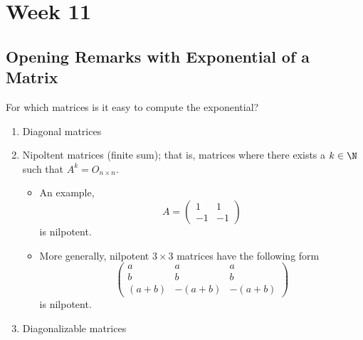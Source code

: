 \section{Week 11}

\subsection{Opening Remarks with Exponential of a Matrix}

\begin{remark}
    For which matrices is it easy to compute the exponential?
    \begin{enumerate}
        \item[(1)] Diagonal matrices
        \item[(2)] Nipoltent matrices (finite sum); that is, matrices where there exists a \( k \in \N  \) such that \( A^{k} = O_{n \times n } \). 
            \begin{itemize}
                \item An example,  
                    \[  A = \begin{pmatrix} 1 & 1 \\ - 1 & - 1  \end{pmatrix}  \]
                    is nilpotent.
                \item More generally, nilpotent \( 3 \times 3  \) matrices have the following form
                    \[  \begin{pmatrix} a & a & a \\ b & b & b \\  (a+b) & -(a+b) & -(a+b) \end{pmatrix}  \]
                    is nilpotent.
            \end{itemize}
        \item[(3)] Diagonalizable matrices
    \end{enumerate}
\end{remark}

